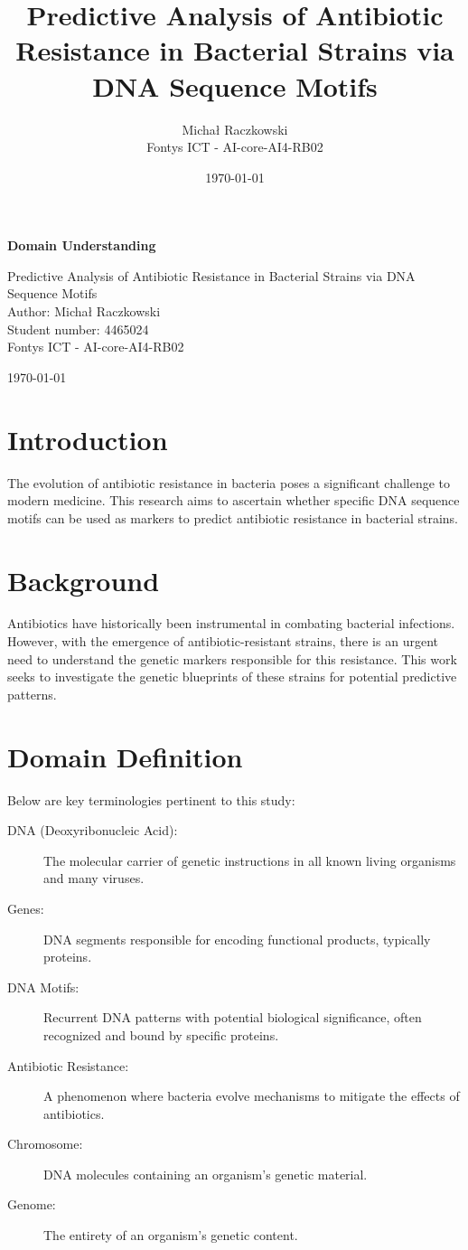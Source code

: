 \documentclass[12pt]{article}
\title{\textbf{Predictive Analysis of Antibiotic Resistance in Bacterial Strains via DNA Sequence Motifs}}
\author{Michał Raczkowski \\
        Fontys ICT - AI-core-AI4-RB02}
\date{\today}
\begin{document}
\begin{titlepage}
    \centering
    \vspace*{\fill}
    {\LARGE \textbf{Domain Understanding}}
    \bigbreak
    \bigbreak

    {\LARGE {Predictive Analysis of Antibiotic Resistance in Bacterial Strains via DNA Sequence Motifs}}
    \vspace{2cm}\\
    \large{Author: Michał Raczkowski}\\
    {Student number: 4465024 }\\
    {Fontys ICT - 
    AI-core-AI4-RB02
    }

    \vspace{2cm}
    \today
    \vspace*{\fill}
\end{titlepage}

\tableofcontents
\newpage

\section{Introduction}
The evolution of antibiotic resistance in bacteria poses a significant challenge to modern medicine. This research aims to ascertain whether specific DNA sequence motifs can be used as markers to predict antibiotic resistance in bacterial strains.

\section{Background}
Antibiotics have historically been instrumental in combating bacterial infections. However, with the emergence of antibiotic-resistant strains, there is an urgent need to understand the genetic markers responsible for this resistance. This work seeks to investigate the genetic blueprints of these strains for potential predictive patterns.

\section{Domain Definition}
Below are key terminologies pertinent to this study:

\begin{description}
    \item[DNA (Deoxyribonucleic Acid):] The molecular carrier of genetic instructions in all known living organisms and many viruses.
    \item[Genes:] DNA segments responsible for encoding functional products, typically proteins.
    \item[DNA Motifs:] Recurrent DNA patterns with potential biological significance, often recognized and bound by specific proteins.
    \item[Antibiotic Resistance:] A phenomenon where bacteria evolve mechanisms to mitigate the effects of antibiotics.
    \item[Chromosome:] DNA molecules containing an organism's genetic material.
    \item[Genome:] The entirety of an organism's genetic content.
\end{description}
\end{document}
